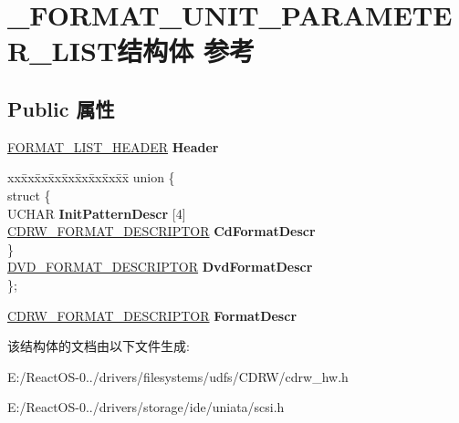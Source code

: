 \hypertarget{struct___f_o_r_m_a_t___u_n_i_t___p_a_r_a_m_e_t_e_r___l_i_s_t}{}\section{\+\_\+\+F\+O\+R\+M\+A\+T\+\_\+\+U\+N\+I\+T\+\_\+\+P\+A\+R\+A\+M\+E\+T\+E\+R\+\_\+\+L\+I\+S\+T结构体 参考}
\label{struct___f_o_r_m_a_t___u_n_i_t___p_a_r_a_m_e_t_e_r___l_i_s_t}
\subsection*{Public 属性}
\begin{DoxyCompactItemize}
\item 
\mbox{\label{struct___f_o_r_m_a_t___u_n_i_t___p_a_r_a_m_e_t_e_r___l_i_s_t_a14a10d7c9cfc55451876c671988cc960}} 
\hyperlink{struct___f_o_r_m_a_t___l_i_s_t___h_e_a_d_e_r}{F\+O\+R\+M\+A\+T\+\_\+\+L\+I\+S\+T\+\_\+\+H\+E\+A\+D\+ER} {\bfseries Header}
\item 
\mbox{\label{struct___f_o_r_m_a_t___u_n_i_t___p_a_r_a_m_e_t_e_r___l_i_s_t_a3da4962fa31e363a13d383934b33542e}} 
\begin{tabbing}
xx\=xx\=xx\=xx\=xx\=xx\=xx\=xx\=xx\=\kill
union \{\\
\mbox{\label{union___f_o_r_m_a_t___u_n_i_t___p_a_r_a_m_e_t_e_r___l_i_s_t_1_1_0D785_a72429f0f1c3f91711ee7db2e3344fc44}} 
\>struct \{\\
\>\>UCHAR {\bfseries InitPatternDescr} \mbox{[}4\mbox{]}\\
\>\>\hyperlink{struct___c_d_r_w___f_o_r_m_a_t___d_e_s_c_r_i_p_t_o_r}{CDRW\_FORMAT\_DESCRIPTOR} {\bfseries CdFormatDescr}\\
\>\} \\
\>\hyperlink{struct___d_v_d___f_o_r_m_a_t___d_e_s_c_r_i_p_t_o_r}{DVD\_FORMAT\_DESCRIPTOR} {\bfseries DvdFormatDescr}\\
\}; \\

\end{tabbing}\item 
\mbox{\label{struct___f_o_r_m_a_t___u_n_i_t___p_a_r_a_m_e_t_e_r___l_i_s_t_a3a30a94186674a64871a4d14d0ac67b0}} 
\hyperlink{struct___c_d_r_w___f_o_r_m_a_t___d_e_s_c_r_i_p_t_o_r}{C\+D\+R\+W\+\_\+\+F\+O\+R\+M\+A\+T\+\_\+\+D\+E\+S\+C\+R\+I\+P\+T\+OR} {\bfseries Format\+Descr}
\end{DoxyCompactItemize}


该结构体的文档由以下文件生成\+:\begin{DoxyCompactItemize}
\item 
E\+:/\+React\+O\+S-\/0../drivers/filesystems/udfs/\+C\+D\+R\+W/cdrw\+\_\+hw.\+h\item 
E\+:/\+React\+O\+S-\/0../drivers/storage/ide/uniata/scsi.\+h\end{DoxyCompactItemize}
